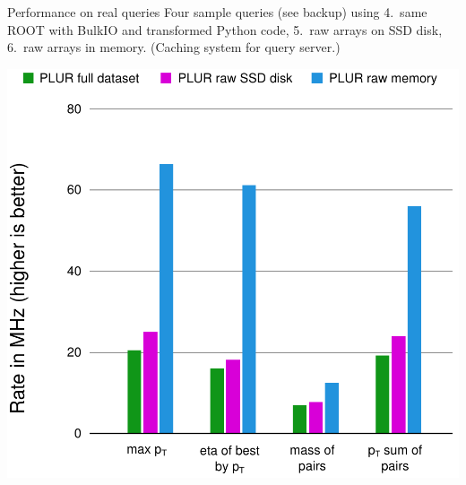 \documentclass{beamer}
\begin{document}
\begin{frame}{Performance on real queries}
\vspace{0.35 cm}
Four sample queries (see backup) using \textcolor{results4}{4.~same ROOT with BulkIO and transformed Python code}, \textcolor{results5}{5.~raw arrays on SSD disk}, \textcolor{results6}{6.~raw arrays in memory}. (Caching system for query server.)

\begin{center}
\includegraphics[width=0.65\linewidth]{physical-media.pdf}
\end{center}
\end{frame}



\end{document}
